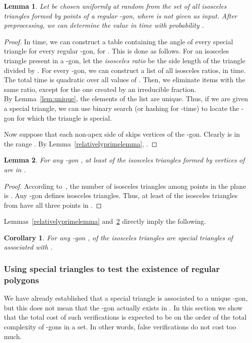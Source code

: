 \documentclass{article}
\newtheorem{lemma}{Lemma}
\newtheorem{cor}{Corollary}
\begin{document}
\begin{lemma}
\label{lem:table}
Let  be chosen uniformly at random
from the set of all isosceles triangles formed by points of a regular -gon, where  is
not given as input.
After  preprocessing, we can determine the value  in  time
 with probability .
\end{lemma}
\begin{proof}
In  time, we can construct a table containing the angle of every special triangle for
every regular -gon, for .   This is done as follows.
For an isosceles triangle present in a -gon, let the {\em isosceles ratio} be the side length of the triangle divided by .
For every -gon, we can construct a list of all isosceles ratios, in  time.
The total time is quadratic over all values of .  Then, we eliminate items with the same ratio, except for the one
created by an irreducible fraction.\\

 By Lemma~\ref{lem:unique}, the elements of the list are unique.
Thus, if we are given a special triangle, we can use binary search (or hashing for -time) to locate
the -gon for which the triangle is special.

Now suppose that each non-apex side of  skips  vertices of the -gon.
Clearly  is in the range .
By Lemma~\ref{relativelyprimelemma}, .  
\end{proof}


\begin{lemma}
\label{big-gon-many-iso}
For any -gon , at least  of the
isosceles triangles formed by vertices of   are in .
\end{lemma}

\begin{proof}
According to~\cite{pach}, the number of isosceles triangles among 
points in the plane is . Any -gon  defines  isosceles triangles. Thus,
at least  of the isosceles triangles from  have all three points in .
\end{proof}

\noindent Lemmas~\ref{relativelyprimelemma} and~\ref{big-gon-many-iso} directly imply the following.
\begin{cor}
\label{c4}
For any -gon ,  of the
isosceles triangles are special triangles of  associated with .
\end{cor}





\subsubsection{Using special triangles to test the existence of regular polygons}
\label{testing}
We have already established that a special triangle is associated to a unique -gon, but 
this does not mean that the  -gon actually exists in .   In this section we show that the total cost
of such verifications is expected to be on the order of the total complexity of -gons in a set.
In other words, false  verifications do not cost too much.
\end{document}
